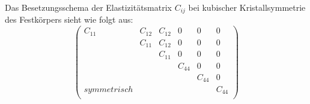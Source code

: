 Das Besetzungsschema der Elastizitätsmatrix $ C_{ij} $ bei kubischer
Kristallsymmetrie des Festkörpers sieht wie folgt aus:
\begin{displaymath}
\left ( \begin{array}{llllll}
         C_{11}  &  C_{12}   &   C_{12}  &    0   &    0   &   0 \\
                 &  C_{11}   &   C_{12}  &    0   &    0   &   0 \\
                 &           &   C_{11}  &    0   &    0   &   0 \\
                 &           &           & C_{44} &    0   &   0 \\
                 &           &           &        & C_{44} &   0 \\
 \scriptstyle symmetrisch   &           &           &
& & C_{44}\\ \end{array}
\right )
\end{displaymath}

